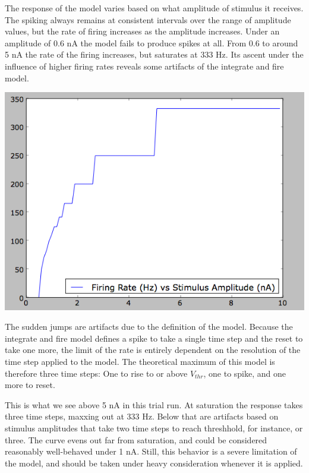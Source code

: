 \documentclass[12pt]{article}
\begin{document}
The response of the model varies based on what amplitude of stimulus it receives.  The spiking always remains at consistent intervals over the range of amplitude values, but the rate of firing increases as the amplitude increases.  Under an amplitude of 0.6 nA the model fails to produce spikes at all.  From 0.6 to around 5 nA the rate of the firing increases, but saturates at 333 Hz.  Its ascent under the influence of higher firing rates reveals some artifacts of the integrate and fire model.

\vspace{15pt}
\includegraphics[scale=0.71]{integratefiretrials.png}
\vspace{5pt}

The sudden jumps are artifacts due to the definition of the model.  Because the integrate and fire model defines a spike to take a single time step and the reset to take one more, the limit of the rate is entirely dependent on the resolution of the time step applied to the model.  The theoretical maximum of this model is therefore three time steps:  One to rise to or above $V_{thr}$, one to spike, and one more to reset.  

This is what we see above 5 nA in this trial run.  At saturation the response takes three time steps, maxxing out at 333 Hz.  Below that are artifacts based on stimulus amplitudes that take two time steps to reach threshhold, for instance, or three.  The curve evens out far from saturation, and could be considered reasonably well-behaved under 1 nA.  Still, this behavior is a severe limitation of the model, and should be taken under heavy consideration whenever it is applied.
\end{document}
